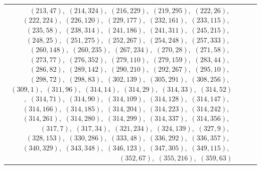 \documentclass[11pt]{article}
\begin{document}
\begin{longtable}{@{}rrl>{\raggedright\arraybackslash}p{}@{}}
$(213,47)$,\allowbreak\ $(214,324)$,\allowbreak\ $(216,229)$,\allowbreak\ $(219,295)$,\allowbreak\ $(222,26)$,\allowbreak\ $(222,224)$,\allowbreak\ $(226,120)$,\allowbreak\ $(229,177)$,\allowbreak\ $(232,161)$,\allowbreak\ $(233,115)$,\allowbreak\ $(235,58)$,\allowbreak\ $(238,314)$,\allowbreak\ $(241,186)$,\allowbreak\ $(241,311)$,\allowbreak\ $(245,215)$,\allowbreak\ $(248,25)$,\allowbreak\ $(251,275)$,\allowbreak\ $(252,267)$,\allowbreak\ $(254,248)$,\allowbreak\ $(257,333)$,\allowbreak\ $(260,148)$,\allowbreak\ $(260,235)$,\allowbreak\ $(267,234)$,\allowbreak\ $(270,28)$,\allowbreak\ $(271,58)$,\allowbreak\ $(273,77)$,\allowbreak\ $(276,352)$,\allowbreak\ $(279,110)$,\allowbreak\ $(279,159)$,\allowbreak\ $(283,44)$,\allowbreak\ $(286,82)$,\allowbreak\ $(289,142)$,\allowbreak\ $(290,210)$,\allowbreak\ $(292,267)$,\allowbreak\ $(295,10)$,\allowbreak\ $(298,72)$,\allowbreak\ $(298,83)$,\allowbreak\ $(302,139)$,\allowbreak\ $(305,291)$,\allowbreak\ $(308,256)$,\allowbreak\ $(309,1)$,\allowbreak\ $(311,96)$,\allowbreak\ $(314,14)$,\allowbreak\ $(314,29)$,\allowbreak\ $(314,33)$,\allowbreak\ $(314,52)$,\allowbreak\ $(314,71)$,\allowbreak\ $(314,90)$,\allowbreak\ $(314,109)$,\allowbreak\ $(314,128)$,\allowbreak\ $(314,147)$,\allowbreak\ $(314,166)$,\allowbreak\ $(314,185)$,\allowbreak\ $(314,204)$,\allowbreak\ $(314,223)$,\allowbreak\ $(314,242)$,\allowbreak\ $(314,261)$,\allowbreak\ $(314,280)$,\allowbreak\ $(314,299)$,\allowbreak\ $(314,337)$,\allowbreak\ $(314,356)$,\allowbreak\ $(317,7)$,\allowbreak\ $(317,34)$,\allowbreak\ $(321,234)$,\allowbreak\ $(324,139)$,\allowbreak\ $(327,9)$,\allowbreak\ $(328,153)$,\allowbreak\ $(330,286)$,\allowbreak\ $(333,48)$,\allowbreak\ $(336,292)$,\allowbreak\ $(336,357)$,\allowbreak\ $(340,329)$,\allowbreak\ $(343,348)$,\allowbreak\ $(346,123)$,\allowbreak\ $(347,305)$,\allowbreak\ $(349,115)$,\allowbreak\ $(352,67)$,\allowbreak\ $(355,216)$,\allowbreak\ $(359,63)$\\

\end{longtable}
\end{document}
